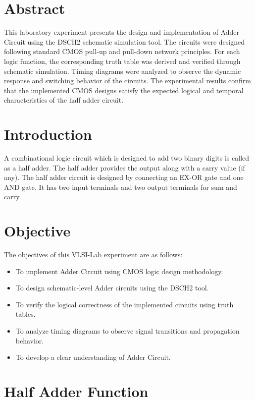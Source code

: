 \documentclass[12pt]{article}
\begin{document}
\tableofcontents
\thispagestyle{empty}
\clearpage
{}

\section*{\center Abstract}
This laboratory experiment presents the design and implementation of Adder Circuit using the DSCH2 schematic simulation tool. The circuits were designed following standard CMOS pull-up and pull-down network principles. For each logic function, the corresponding truth table was derived and verified through schematic simulation. Timing diagrams were analyzed to observe the dynamic response and switching behavior of the circuits. The experimental results confirm that the implemented CMOS designs satisfy the expected logical and temporal characteristics of the half adder circuit.


\section{Introduction}
A combinational logic circuit which is designed to add two binary digits is called as a half adder. The half adder provides the output along with a carry value (if any). The half adder circuit is designed by connecting an EX-OR gate and one AND gate. It has two input terminals and two output terminals for sum and carry.


\section{Objective}
The objectives of this VLSI-Lab experiment are as follows:
\begin{itemize}
    \item To implement Adder Circuit using CMOS logic design methodology.
    \item To design schematic-level Adder circuits using the DSCH2 tool.
    \item To verify the logical correctness of the implemented circuits using truth tables.
    \item To analyze timing diagrams to observe signal transitions and propagation behavior.
    \item To develop a clear understanding of Adder Circuit.
\end{itemize}

\section{Half Adder Function}
\end{document}
